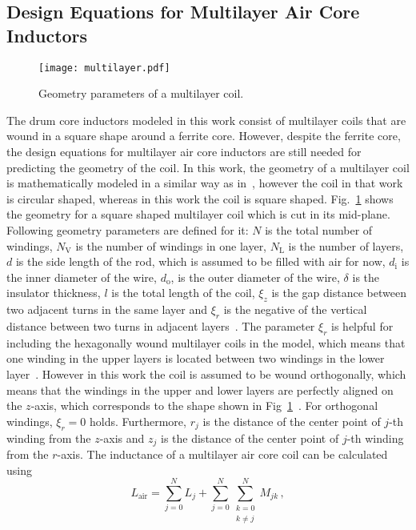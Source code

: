 \subsection{Design Equations for Multilayer Air Core Inductors}
\begin{figure}[ptb]
	\centering
	\texttt{[image: multilayer.pdf]}
	\caption{Geometry parameters of a multilayer coil.}
	\label{fig:multilayer}
\end{figure} 
The drum core inductors modeled in this work consist of multilayer coils that are wound in a square shape around a ferrite core. However, despite the ferrite core, the design equations for multilayer air core inductors are still needed for predicting the geometry of the coil. In this work, the geometry of a multilayer coil is mathematically modeled in a similar way as in~\cite{6732932}, however the coil in that work is circular shaped, whereas in this work the coil is square shaped. Fig.~\ref{fig:multilayer} shows the geometry for a square shaped multilayer coil which is cut in its mid-plane. Following geometry parameters are defined for it: $N$ is the total number of windings, $N_\mathrm{V}$ is the number of windings in one layer, $N_\mathrm{L}$ is the number of layers, $d$ is the side length of the rod, which is assumed to be filled with air for now, $d_\mathrm{i}$ is the inner diameter of the wire, $d_\mathrm{o}$, is the outer diameter of the wire, $\delta$ is the insulator thickness, $l$ is the total length of the coil, $\xi_z$ is the gap distance between two adjacent turns in the same layer and $\xi_r$ is the negative of the vertical distance between two turns in adjacent layers~\cite{6732932}. The parameter $\xi_r$ is helpful for including the hexagonally wound multilayer coils in the model, which means that one winding in the upper layers is located between two windings in the lower layer~\cite{6732932}. However in this work the coil is assumed to be wound orthogonally, which means that the windings in the upper and lower layers are perfectly aligned on the $z$-axis, which corresponds to the shape shown in Fig~\ref{fig:multilayer}~\cite{6732932}. For orthogonal windings, $\xi_r = 0$ holds. Furthermore, $r_j$ is the distance of the center point of $j$-th winding from the $z$-axis and $z_j$ is the distance of the center point of $j$-th winding from the $r$-axis. The inductance of a multilayer air core coil can be calculated using 
\begin{equation} \label{eqn:multilayer_eqn1}
	L_\mathrm{air} = \sum_{j=0}^{N}L_j + \sum_{j=0}^{N}\sum_{\substack{k=0 \\ k\neq j}}^{N} M_{jk}\,,
\end{equation}

